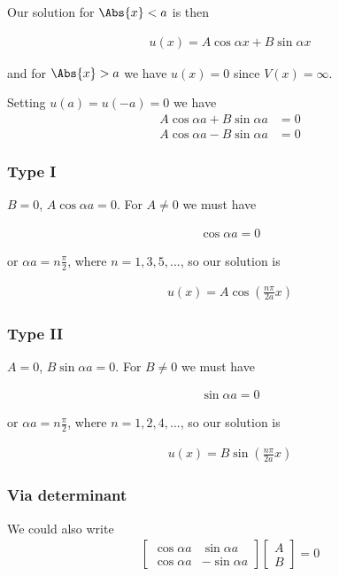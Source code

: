 Our solution for $\Abs{x} < a$ is then

\begin{align}\label{eqn:PHY356Lecture9:8}
u(x) = A \cos \alpha x + B \sin\alpha x
\end{align}

and for $\Abs{x} > a$ we have $u(x) = 0$ since $V(x) = \infty$.

Setting $u(a) = u(-a) = 0$ we have
\begin{align*}
A \cos \alpha a + B \sin\alpha a &= 0 \\
A \cos \alpha a - B \sin\alpha a &= 0
\end{align*}


\subsubsection{Type I}
$B=0$, $A \cos\alpha a = 0$.  For $A \ne 0$ we must have

\begin{align*}
\cos \alpha a = 0
\end{align*}

or $\alpha a = n \frac{\pi}{2}$, where $n = 1, 3, 5, ...$, so our solution is

\begin{align}\label{eqn:PHY356Lecture9:9}
u(x) = A \cos \left( \frac{n \pi}{2 a} x \right)
\end{align}

\subsubsection{Type II}
$A=0$, $B \sin\alpha a = 0$.  For $B \ne 0$ we must have

\begin{align*}
\sin \alpha a = 0
\end{align*}

or $\alpha a = n \frac{\pi}{2}$, where $n = 1, 2, 4, ...$, so our solution is

\begin{align}\label{eqn:PHY356Lecture9:10}
u(x) = B \sin \left( \frac{n \pi}{2 a} x \right)
\end{align}

\subsubsection{Via determinant}

We could also write
\begin{align*}
\begin{bmatrix}
\cos \alpha a & \sin\alpha a \\
\cos \alpha a & - \sin\alpha a
\end{bmatrix}
\begin{bmatrix}
A \\
B
\end{bmatrix}
= 0
\end{align*}

